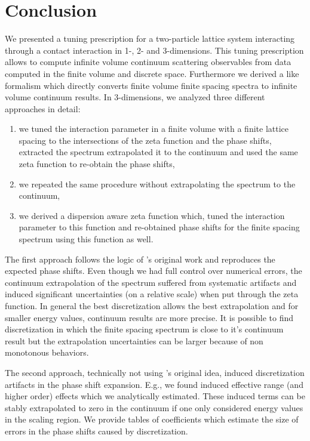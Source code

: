 \section{Conclusion}\label{sec:conclusion}

We presented a tuning prescription for a two-particle lattice system interacting through a contact interaction in 1-, 2- and 3-dimensions.
This tuning prescription allows to compute infinite volume continuum scattering observables from data computed in the finite volume and discrete space.
Furthermore we derived a \Luscher like formalism which directly converts finite volume finite spacing spectra to infinite volume continuum results.
In 3-dimensions, we analyzed three different approaches in detail:
\begin{enumerate}
	\item we tuned the interaction parameter in a finite volume with a finite lattice spacing to the intersections of the \Luscher zeta function and the phase shifts, extracted the spectrum extrapolated it to the continuum and used the same \Luscher zeta function to re-obtain the phase shifts,
	\item we repeated the same procedure without extrapolating the spectrum to the continuum,
	\item we derived a dispersion aware zeta function which, tuned the interaction parameter to this function and re-obtained phase shifts for the finite spacing spectrum using this function as well.
\end{enumerate}

The first approach follows the logic of \Luscher's original work and reproduces the expected phase shifts.
Even though we had full control over numerical errors, the continuum extrapolation of the spectrum suffered from systematic artifacts and induced significant uncertainties (on a relative scale) when put through the zeta function.
In general the best discretization allows the best extrapolation and for smaller energy values, continuum results are more precise.
It is possible to find discretization in which the finite spacing spectrum is close to it's continuum result but the extrapolation uncertainties can be larger because of non monotonous behaviors.

The second approach, technically not using \Luscher's original idea, induced discretization artifacts in the phase shift expansion.
E.g., we found induced effective range (and higher order) effects which we analytically estimated.
These induced terms can be stably extrapolated to zero in the continuum if one only considered energy values in the scaling region.
We provide tables of coefficients which estimate the size of errors in the phase shifts caused by discretization.

